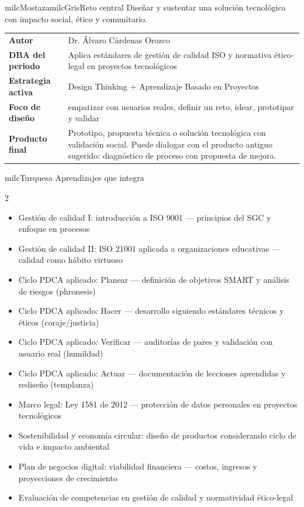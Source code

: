 \documentclass[11pt,letterpaper]{article}
\begin{document}
\begin{softbox}{milcMostaza}{milcGris}{Reto central}
Diseñar y sustentar una solución tecnológica con impacto social, ético y comunitario.
\end{softbox}

\begin{tabularx}{\textwidth}{>{\bfseries}p{3.4cm}X}
\rowcolor{milcMagenta!12}Autor & Dr. Álvaro Cárdenas Orozco\\
DBA del periodo & Aplica estándares de gestión de calidad ISO y normativa ético-legal en proyectos tecnológicos\\
Estrategia activa & Design Thinking + Aprendizaje Basado en Proyectos\\
Foco de diseño & empatizar con usuarios reales, definir un reto, idear, prototipar y validar\\
Producto final & Prototipo, propuesta técnica o solución tecnológica con validación social. Puede dialogar con el producto antiguo sugerido: diagnóstico de proceso con propuesta de mejora.\\
\end{tabularx}

\begin{titlebox}{milcTurquesa}
Aprendizajes que integra
\end{titlebox}
\begin{multicols}{2}
\begin{itemize}[leftmargin=*]
\item Gestión de calidad I: introducción a ISO 9001 — principios del SGC y enfoque en procesos
\item Gestión de calidad II: ISO 21001 aplicada a organizaciones educativas — calidad como hábito virtuoso
\item Ciclo PDCA aplicado: Planear — definición de objetivos SMART y análisis de riesgos (phronesis)
\item Ciclo PDCA aplicado: Hacer — desarrollo siguiendo estándares técnicos y éticos (coraje/justicia)
\item Ciclo PDCA aplicado: Verificar — auditorías de pares y validación con usuario real (humildad)
\item Ciclo PDCA aplicado: Actuar — documentación de lecciones aprendidas y rediseño (templanza)
\item Marco legal: Ley 1581 de 2012 — protección de datos personales en proyectos tecnológicos
\item Sostenibilidad y economía circular: diseño de productos considerando ciclo de vida e impacto ambiental
\item Plan de negocios digital: viabilidad financiera — costos, ingresos y proyecciones de crecimiento
\item Evaluación de competencias en gestión de calidad y normatividad ético-legal
\end{itemize}
\end{multicols}
\end{document}
